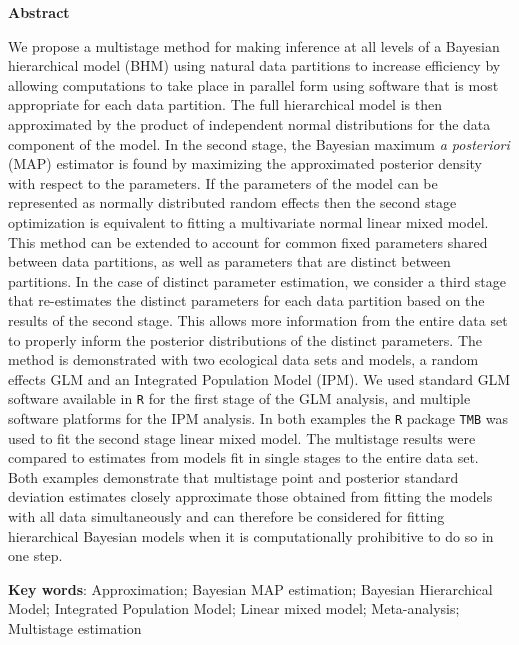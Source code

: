 \documentclass[12pt]{article}
\begin{document}
\vspace*{\fill}
\begin{center}
\begin{minipage}{0.65\paperwidth}
\renewcommand{\baselinestretch}{1}\normalsize

\centerline{\bf Abstract} 
We propose a multistage method for making inference at all levels of a Bayesian hierarchical model (BHM) using natural data partitions to increase efficiency by allowing computations to take place in parallel form using software that is most appropriate for each data partition. The full hierarchical model is then approximated by the product of independent normal distributions for the data component of the model. In the second stage, the Bayesian maximum {\it a posteriori} (MAP) estimator is found by maximizing the approximated posterior density with respect to the parameters. If the parameters of the model can be represented as normally distributed random effects then the second stage optimization is equivalent to fitting a multivariate normal linear mixed model. This method can be extended to account for common fixed parameters shared between data partitions, as well as parameters that are distinct between partitions. In the case of distinct parameter estimation, we consider a third stage that re-estimates the distinct parameters for each data partition based on the results of the second stage. This allows more information from the entire data set to properly inform the posterior distributions of the distinct parameters. The method is demonstrated with two ecological data sets and models, a random effects GLM and an Integrated Population Model (IPM). We used standard GLM software available in {\tt R} for the first stage of the GLM analysis, and multiple software platforms for the IPM analysis. In both examples the {\tt R} package {\tt TMB} was used to fit the second stage linear mixed model. The multistage results were compared to estimates from models fit in single stages to the entire data set. Both examples demonstrate that multistage point and posterior standard deviation estimates closely approximate those obtained from fitting the models with all data simultaneously and can therefore be considered for fitting hierarchical Bayesian models when it is computationally prohibitive to do so in one step.     

\bigskip

{\bf Key words}: Approximation; Bayesian MAP estimation; Bayesian Hierarchical Model; Integrated Population Model; Linear mixed model; Meta-analysis; Multistage estimation
\end{minipage}
\end{center}
\end{document}
